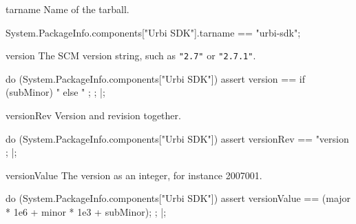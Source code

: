 \begin{urbiscriptapi}
\item[tarname] Name of the tarball.
\begin{urbiassert}
System.PackageInfo.components["Urbi SDK"].tarname
  == "urbi-sdk";
\end{urbiassert}

\item[version] The SCM version string, such as \lstinline|"2.7"| or
  \lstinline|"2.7.1"|.
\begin{urbiscript}
do (System.PackageInfo.components["Urbi SDK"])
{
  assert
  {
    version ==
      {
        if (subMinor)
          "%
        else
          "%
      };
  };
}|;
\end{urbiscript}

\item[versionRev] Version and revision together.
\begin{urbiscript}
do (System.PackageInfo.components["Urbi SDK"])
{
  assert
  {
    versionRev
    == "version %
  };
}|;
\end{urbiscript}

\item[versionValue] The version as an integer, for instance 2007001.
\begin{urbiscript}
do (System.PackageInfo.components["Urbi SDK"])
{
  assert
  {
    versionValue == (major * 1e6 + minor * 1e3 + subMinor);
  };
}|;
\end{urbiscript}
\end{urbiscriptapi}

